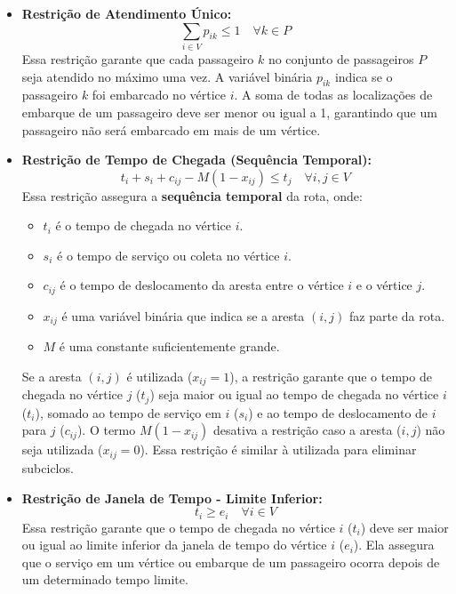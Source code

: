 \documentclass[12pt, a4paper]{report}
\begin{document}
\begin{itemize}
    \item \textbf{Restrição de Atendimento Único:}
    \begin{equation}
        \sum_{i \in V} p_{ik} \leq 1 \quad \forall k \in P
    \end{equation}
    Essa restrição garante que cada passageiro $k$ no conjunto de passageiros $P$ seja atendido no máximo uma vez. A variável binária $p_{ik}$ indica se o passageiro $k$ foi embarcado no vértice $i$. A soma de todas as localizações de embarque de um passageiro deve ser menor ou igual a 1, garantindo que um passageiro não será embarcado em mais de um vértice.

    \item \textbf{Restrição de Tempo de Chegada (Sequência Temporal):}
    \begin{equation}
        t_i + s_i + c_{ij} - M(1-x_{ij}) \leq t_j \quad \forall i,j \in V
    \end{equation}
    Essa restrição assegura a \textbf{sequência temporal} da rota, onde:
    \begin{itemize}
        \item $t_i$ é o tempo de chegada no vértice $i$.
        \item $s_i$ é o tempo de serviço ou coleta no vértice $i$.
        \item $c_{ij}$ é o tempo de deslocamento da aresta entre o vértice $i$ e o vértice $j$.
        \item $x_{ij}$ é uma variável binária que indica se a aresta $(i, j)$ faz parte da rota.
         \item $M$ é uma constante suficientemente grande.
    \end{itemize}
    Se a aresta $(i, j)$ é utilizada ($x_{ij} = 1$), a restrição garante que o tempo de chegada no vértice $j$ ($t_j$) seja maior ou igual ao tempo de chegada no vértice $i$ ($t_i$), somado ao tempo de serviço em $i$ ($s_i$) e ao tempo de deslocamento de $i$ para $j$ ($c_{ij}$).  O termo $M(1-x_{ij})$ desativa a restrição caso a aresta ($i,j$) não seja utilizada ($x_{ij} = 0$). Essa restrição é similar à utilizada para eliminar subciclos.

     \item \textbf{Restrição de Janela de Tempo - Limite Inferior:}
    \begin{equation}
        t_i \geq e_i \quad \forall i \in V
    \end{equation}
    Essa restrição garante que o tempo de chegada no vértice $i$ ($t_i$) deve ser maior ou igual ao limite inferior da janela de tempo do vértice $i$ ($e_i$). Ela assegura que o serviço em um vértice ou embarque de um passageiro ocorra depois de um determinado tempo limite.


\end{itemize}
\end{document}

